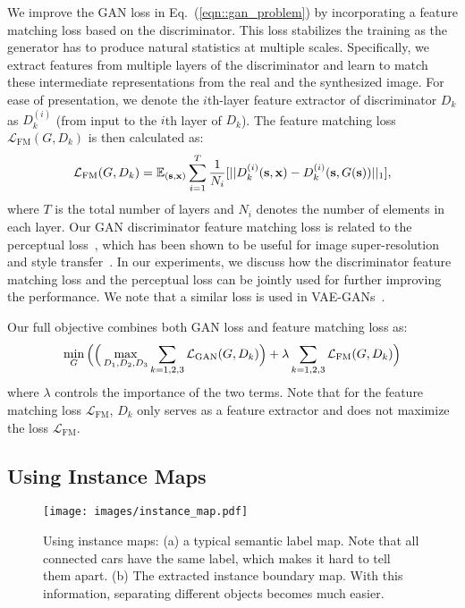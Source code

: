 \documentclass[10pt,twocolumn,letterpaper]{article}
\newcommand{\lblfig}[1]{\label{fig:#1}}
\newcommand{\lblsec}[1]{\label{sec:#1}}
\newcommand{\s}{\mathbf{s}}
\newcommand{\x}{\mathbf{x}}
\begin{document}
 We improve the GAN loss in Eq.~(\ref{eqn::gan_problem}) by incorporating a feature matching loss based on the discriminator. This loss stabilizes the training as the generator has to produce natural statistics at multiple scales. Specifically, we extract features from multiple layers of the discriminator and learn to match these intermediate representations from the real and the synthesized image. For ease of presentation, we denote the $i$th-layer feature extractor of discriminator $D_k$ as $D_k^{(i)}$ (from input to the $i$th layer of $D_k$). The feature matching loss $\mathcal{L}_{\text{FM}}(G,D_k)$ is then calculated as:
\begin{equation}
\small
    \mathcal{L}_{\text{FM}}(G,D_k) = \mathbb{E}_{(\s,\x)} \sum_{i=1}^T \frac{1}{N_i}[||D_k^{(i)}(\s,\x)-D_k^{(i)}(\s,G(\s))||_1],
\end{equation}
where $T$ is the total number of layers and $N_i$ denotes the number of elements in each layer.  Our GAN discriminator feature matching loss is related to the perceptual loss~\cite{gatys2016image,johnson2016perceptual,dosovitskiy2016generating}, which has been shown to be useful for image super-resolution~\cite{ledig2016photo} and style transfer~\cite{johnson2016perceptual}. 
In our experiments, we discuss how the discriminator feature matching loss and the perceptual loss can be jointly used for further improving the performance. 
We note that a similar loss is used in VAE-GANs~\cite{larsen2015autoencoding}.

Our full objective combines both GAN loss and feature matching loss as:
\begin{equation}
\footnotesize
\min_{G}\bigg(\Big(\max_{D_1,D_2,D_3} \sum_{k=1,2,3}\mathcal{L}_{\text{GAN}}(G,D_k)\Big) + \lambda \sum_{k=1,2,3}\mathcal{L}_{\text{FM}}(G,D_k)\bigg)
\label{eqn::multigan}
\end{equation}
where $\lambda$ controls the importance of the two terms. Note that for the feature matching loss $\mathcal{L}_{\text{FM}}$, $D_k$ only serves as a feature extractor and does not maximize the loss $\mathcal{L}_{\text{FM}}$.

\subsection{Using Instance Maps} \lblsec{alg:inst}
\begin{figure}
  \centering
  \texttt{[image: images/instance\_map.pdf]}   
  \caption{Using instance maps: (a) a typical semantic label map. Note that all connected cars have the same label, which makes it hard to tell them apart.
  (b) The extracted instance boundary map. With this information, separating different objects becomes much easier.
  }  
  \lblfig{inst}
\end{figure}
\end{document}

